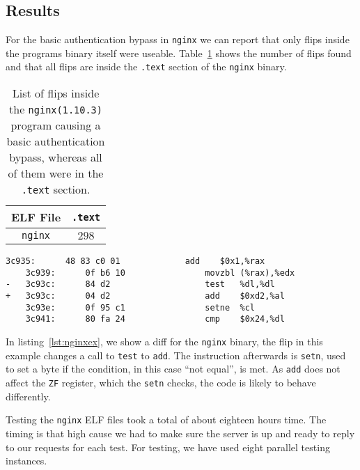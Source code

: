 \subsection{Results}

For the basic authentication bypass in \texttt{nginx} we can report that only
flips inside the program\textquotesingle s binary itself were useable.
Table~\ref{tab:nginxres} shows the number of flips found and that all flips are
inside the \texttt{.text} section of the \texttt{nginx} binary.

\begin{table}[!htb]
\centering
\begin{tabular}{c|c}
ELF File               & \texttt{.text} \\ \hline
\texttt{nginx}         & $298$
\end{tabular}
\caption{List of flips inside the \texttt{nginx(1.10.3)} program causing a
basic authentication bypass, whereas all of them were in the \texttt{.text}
section.}
\label{tab:nginxres}
\end{table}

\begin{minipage}{\linewidth}
\begin{lstlisting}[style=diff,
                   caption={Diff for a bitflip applied to the \texttt{nginx}
binary in order to bypass a credential check. The call to \texttt{test} is
replaced by \texttt{add} which doesn't chage a register the \texttt{setne}
instruction would check.},
label=lst:nginxex]
    3c935:      48 83 c0 01             add    $0x1,%rax
    3c939:      0f b6 10                movzbl (%rax),%edx
-   3c93c:      84 d2                   test   %dl,%dl
+   3c93c:      04 d2                   add    $0xd2,%al
    3c93e:      0f 95 c1                setne  %cl
    3c941:      80 fa 24                cmp    $0x24,%dl
\end{lstlisting}
\end{minipage}

In listing~\ref{lst:nginxex}, we show a diff for the \texttt{nginx} binary, the
flip in this example changes a call to \texttt{test} to \texttt{add}. The
instruction afterwards is \texttt{setn}, used to set a byte if the condition,
in this case ``not equal'', is met. As \texttt{add}
does not affect the \texttt{ZF} register, which the \texttt{setn} checks, the
code is likely to behave differently.

Testing the \texttt{nginx} ELF files took a total of about eighteen hours time.
The timing is that high cause we had to make sure the server is up and ready to
reply to our requests for each test. For testing, we have used eight parallel
testing instances.


